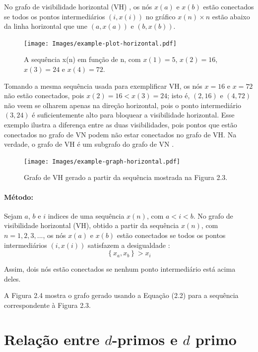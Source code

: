 \documentclass[12pt,a4paper,fleqn]{report}
\begin{document}
No grafo de visibilidade horizontal (VH) \cite{a13}, os nós
$x(a)$ e $x(b)$ estão conectados se
todos os pontos intermediários $(i,x(i))$ no gráfico $x(n) \times
n$ estão abaixo da linha horizontal que une  $(a, x(a))$ e
$(b,x(b))$. 

\begin{figure}[h]
    \centering
    \texttt{[image: Images/example-plot-horizontal.pdf]}
    \caption{A sequência x(n) em função de n, com $x(1) = 5$, $x(2) = 16$, $x(3) = 24$ e
$x(4) = 72$.}
\end{figure}

Tomando a mesma sequência usada para exemplificar VH, os nós $x=16$ e $x=72$
não estão conectados, pois $x(2)=16<x(3)=24$; isto é, $(2,16)$
e $(4,72)$ não veem se olharem apenas na direção horizontal, pois o ponto intermediário $(3,24)$
é suficientemente alto para bloquear a visibilidade horizontal. Esse exemplo ilustra a
diferença entre as duas visibilidades, pois  pontos que  estão conectados
no grafo de VN podem não estar conectados no grafo de VH. Na verdade, o grafo de VH é um subgrafo do grafo de VN \cite{a13}.

\begin{figure}[h]
    \centering
    \texttt{[image: Images/example-graph-horizontal.pdf]}
    \caption{Grafo de VH gerado a partir da sequência mostrada na Figura 2.3.}
\end{figure}

\paragraph*{Método:} Sejam $a$, $b$ e $i$ indices de uma sequência
$x(n)$, com  $a < i < b$. No grafo de visibilidade horizontal (VH), obtido a partir da sequência $x(n)$, com $n=1,2,3,...$, os nós $x(a)$ e $x(b)$ estão conectados se todos os pontos intermediários $(i,x(i))$ satisfazem a desigualdade \cite{a13}:
\begin{equation}
\label{hv}
\left\{ x_a, x_b \right\} > x_i
\end{equation}

\noindent Assim,
dois nós estão conectados se nenhum ponto intermediário
está acima deles.

A Figura 2.4 mostra o grafo gerado usando a Equação (2.2) para a sequência correspondente à Figura 2.3.



\section{Relação entre $d$-primos e $d$ primo}
\end{document}
